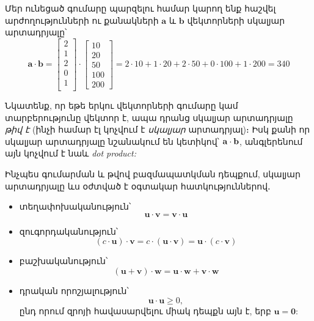Մեր ունեցած գումարը պարզելու համար կարող ենք հաշվել արժո\-ղու\-թյուն\-ների ու քանակների  $\mathbf{a}$ և $ \mathbf{b}$ վեկտորների սկալյար արտադրյալը՝
$$\mathbf{a} \cdot \mathbf{b}= \begin{bmatrix}
2 \\1 \\2 \\0 \\1 \\
\end{bmatrix}\cdot \begin{bmatrix}
10 \\ 20 \\ 50 \\ 100 \\ 200
\end{bmatrix} = 2 \cdot 10 + 1 \cdot 20 + 2 \cdot 50 + 0 \cdot 100 + 1\cdot 200 = 340 $$

Նկատենք, որ եթե երկու վեկտորների գումարը կամ տարբերությունը վեկտոր է, ապա դրանց սկալյար արտադրյալը \textit{թիվ է} (ինչի համար էլ կոչվում է \textit{սկալյար} արտադրյալ)։ Իսկ քանի որ սկալյար արտադրյալը նշանակում են կետիկով՝ $\mathbf{a} \cdot \mathbf{b}$, անգլերենում այն կոչվում է նաև {\it dot product:}


Ինչպես գումարման և թվով բազմապատկման դեպքում, սկալյար արտադրյալը ևս օժտված է օգտակար հատկություններով․
\begin{itemize}
  \item տեղափոխականություն՝ $$ \mathbf{u} \cdot \mathbf{v} = \mathbf{v} \cdot \mathbf{u}$$
  \item զուգորդականություն՝ $$(c \cdot \mathbf{u}) \cdot \mathbf{v} = c \cdot (\mathbf{u} \cdot \mathbf{v}) = \mathbf{u} \cdot (c \cdot \mathbf{v})$$
  \item բաշխականություն՝ $$ (\mathbf{u} + \mathbf{v}) \cdot \mathbf{w} = \mathbf{u} \cdot \mathbf{w} + \mathbf{v} \cdot \mathbf{w} $$
  \item դրական որոշյալություն՝ 
  $$\mathbf{u} \cdot \mathbf{u} \geq 0, $$
  ընդ որում զրոյի հավասարվելու միակ դեպքն այն է, երբ $\mathbf{u} = \mathbf{0}$:
\end{itemize}



